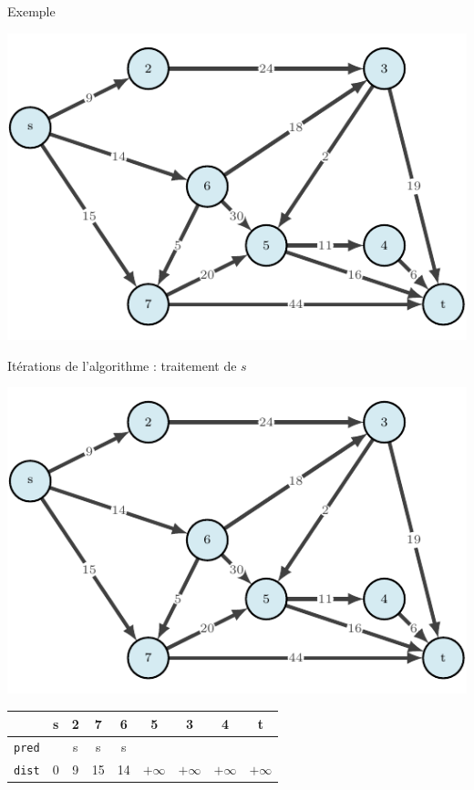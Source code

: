 \begin{frame}{Exemple}
    \begin{center}
        \includegraphics[height=.6\textheight]{fig/dijkstra-0.pdf}

    \end{center}
\end{frame}

\begin{frame}{Itérations de l'algorithme : traitement de $s$}
    \begin{center}
        \includegraphics[height=.6\textheight]{fig/dijkstra-0.pdf}      
    \begin{tabular}{c|cccccccc}
      
        & \textbf{s}   &2      &7      &6      &5      &3      &4      &t      \\
        \hline
        \texttt{pred} & &s      &s      &s      &       &       &       &       \\
        \texttt{dist} & 0       &9      &15     &14     &$+\infty$    &$+\infty$    &$+\infty$    &$+\infty$    \\
            \end{tabular}
\end{center}
\end{frame}


